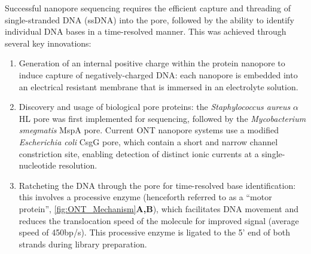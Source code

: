 Successful nanopore sequencing requires the efficient capture and threading of single-stranded DNA (ssDNA) into the pore, followed by the ability to identify individual DNA bases in a time-resolved manner. This was achieved through several key innovations\cite{Bayley2015}: 
\begin{enumerate}
	\item Generation of an internal positive charge within the protein nanopore to induce capture of negatively-charged DNA: each nanopore is embedded into an electrical resistant membrane that is immersed in an electrolyte solution.
	\item Discovery and usage of biological pore proteins: the \textit{Staphylococcus aureus} \textit{$\alpha$}HL pore was first implemented for sequencing\cite{N2005}, followed by the \textit{Mycobacterium smegmatis} MspA pore\cite{Manrao2011}. Current ONT nanopore systems use a modified \textit{Escherichia coli} CsgG pore, which contain a short and narrow channel constriction site, enabling detection of distinct ionic currents at a single-nucleotide resolution. 
	\item Ratcheting the DNA through the pore for time-resolved base identification: this involves a processive enzyme (henceforth referred to as a “motor protein”, \cref{fig:ONT_Mechanism}\textbf{A,B}), which facilitates DNA movement and reduces the translocation speed of the molecule for improved signal (average speed of 450bp/s)\cite{Rang2018}. This processive enzyme is ligated to the 5' end of both strands during library preparation.   
\end{enumerate}

